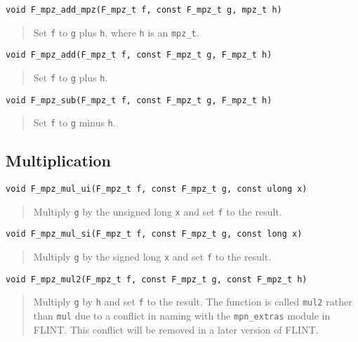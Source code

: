 \documentclass[a4paper,10pt]{article}
\newcommand{\code}{\lstinline}
\begin{document}
\begin{lstlisting}
void F_mpz_add_mpz(F_mpz_t f, const F_mpz_t g, mpz_t h)
\end{lstlisting}
\begin{quote}
Set \code{f} to \code{g} plus \code{h}, where \code{h} is an \code{mpz_t}. 
\end{quote}

\begin{lstlisting}
void F_mpz_add(F_mpz_t f, const F_mpz_t g, F_mpz_t h)
\end{lstlisting}
\begin{quote}
Set \code{f} to \code{g} plus \code{h}. 
\end{quote}

\begin{lstlisting}
void F_mpz_sub(F_mpz_t f, const F_mpz_t g, F_mpz_t h)
\end{lstlisting}
\begin{quote}
Set \code{f} to \code{g} minus \code{h}. 
\end{quote}

\subsection{Multiplication}

\begin{lstlisting}
void F_mpz_mul_ui(F_mpz_t f, const F_mpz_t g, const ulong x)
\end{lstlisting}
\begin{quote}
Multiply \code{g} by the unsigned long \code{x} and set \code{f} to the result.
\end{quote}

\begin{lstlisting}
void F_mpz_mul_si(F_mpz_t f, const F_mpz_t g, const long x)
\end{lstlisting}
\begin{quote}
Multiply \code{g} by the signed long \code{x} and set \code{f} to the result.
\end{quote}

\begin{lstlisting}
void F_mpz_mul2(F_mpz_t f, const F_mpz_t g, const F_mpz_t h)
\end{lstlisting}
\begin{quote}
Multiply \code{g} by \code{h} and set \code{f} to the result. The function is called \code{mul2} rather than \code{mul} due to a conflict in naming with the \code{mpn_extras} module in FLINT. This conflict will be removed in a later version of FLINT.
\end{quote}
\end{document}
